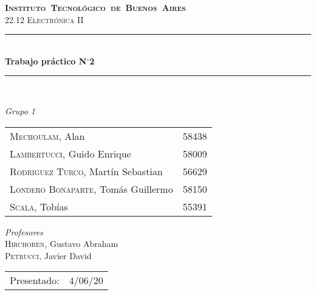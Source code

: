 \begin{titlepage}
\newcommand{\HRule}{\rule{\linewidth}{0.5mm}}
\center
\mbox{\textsc{\LARGE \bfseries {Instituto Tecnológico de Buenos Aires}}}\\[1.5cm]
\textsc{\Large 22.12 Electrónica II}\\[0.5cm]


\HRule \\[0.6cm]
{ \Huge \bfseries Trabajo práctico N$^{\circ}$2}\\[0.4cm] 
\HRule \\[1.5cm]


{\large

\emph{Grupo 1}\\
\vspace{3px}

\begin{tabular}{lr} 	
\textsc{Mechoulam}, Alan  &  58438\\
\textsc{Lambertucci}, Guido Enrique  & 58009 \\
\textsc{Rodriguez Turco}, Martín Sebastian  & 56629 \\
\textsc{Londero Bonaparte}, Tomás Guillermo  & 58150 \\
\textsc{Scala}, Tobías & 55391 \\
\end{tabular}

\vspace{20px}

\emph{Profesores}\\
\textsc{Hirchoren}, Gustavo Abraham\\
\textsc{Petrucci}, Javier David\\
\vspace{3px}

\vspace{100px}

\begin{tabular}{ll}

Presentado: & 4/06/20\\

\end{tabular}

}

\vfill

\end{titlepage}
